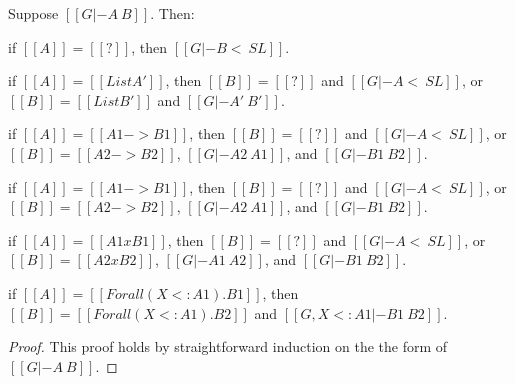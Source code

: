 \begin{lemma}
  \label{lemma:inversion_of_type_consistency}
  Suppose $[[G |- A ~ B]]$. Then:
  \begin{enumR}
  \item if $[[A]] = [[?]]$, then $[[G |- B <~ SL]]$.
  \item if $[[A]] = [[List A']]$, then $[[B]] = [[?]]$ and $[[G |- A <~ SL]]$, or
    $[[B]] = [[List B']]$ and $[[G |- A' ~ B']]$.
  \item if $[[A]] = [[A1 -> B1]]$, then $[[B]] = [[?]]$ and $[[G |- A <~ SL]]$, or
    $[[B]] = [[A2 -> B2]]$, $[[G |- A2 ~ A1]]$, and $[[G |- B1 ~ B2]]$.
  \item if $[[A]] = [[A1 -> B1]]$, then $[[B]] = [[?]]$ and $[[G |- A <~ SL]]$, or
    $[[B]] = [[A2 -> B2]]$, $[[G |- A2 ~ A1]]$, and $[[G |- B1 ~ B2]]$.
  \item if $[[A]] = [[A1 x B1]]$, then $[[B]] = [[?]]$ and $[[G |- A <~ SL]]$, or
    $[[B]] = [[A2 x B2]]$, $[[G |- A1 ~ A2]]$, and $[[G |- B1 ~ B2]]$.
  \item if $[[A]] = [[Forall (X <: A1).B1]]$, then $[[B]] = [[Forall (X <: A1).B2]]$ and $[[G, X <: A1 |- B1 ~ B2]]$.
  \end{enumR}
\end{lemma}
\begin{proof}
  This proof holds by straightforward induction on the the form of $[[G |- A ~ B]]$.
\end{proof}

